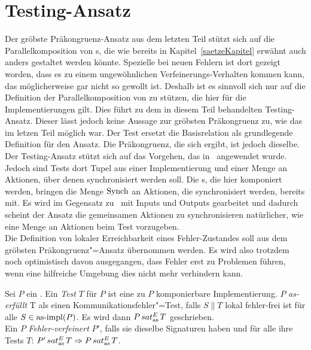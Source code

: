 \section{Testing-Ansatz}

Der gröbste Präkongruenz-Ansatz aus dem letzten Teil stützt sich auf die
Parallelkomposition von \MEIO{}s, die wie bereits in
Kapitel~\ref{saetzeKapitel} erwähnt auch anders gestaltet werden könnte.
Spezielle bei neuen Fehlern ist dort gezeigt worden, dass es zu einem
ungewöhnlichen Verfeinerungs-Verhalten kommen kann, das möglicherweise gar
nicht so gewollt ist. Deshalb ist es sinnvoll sich nur auf die Definition der
Parallelkomposition von \EIO{} zu stützen, die hier für die Implementierungen
gilt. Dies führt zu dem in diesem Teil behandelten Testing-Ansatz. Dieser lässt
jedoch keine Aussage zur gröbsten Präkongruenz zu, wie das im letzen Teil
möglich war. Der Test ersetzt die Basisrelation als grundlegende Definition für
den Ansatz. Die Präkongruenz, die sich ergibt, ist jedoch dieselbe.\\
Der Testing-Ansatz stützt sich auf das Vorgehen, das
in~\cite{Vogler2015FailSem} angewendet wurde. Jedoch sind Tests dort Tupel aus
einer Implementierung und einer Menge an Aktionen, über denen synchronisiert
werden soll. Die \MEIO{}s, die hier komponiert werden, bringen die Menge
$\mathrm{Synch}$ an Aktionen, die synchronisiert werden, bereits mit. Es wird im
Gegensatz zu~\cite{Vogler2015FailSem} mit Inputs und Outputs gearbeitet und
dadurch scheint der Ansatz die gemeinsamen Aktionen zu synchronisieren
natürlicher, wie eine Menge an Aktionen beim Test vorzugeben.\\
Die Definition von lokaler Erreichbarkeit eines Fehler-Zustandes soll aus dem
gröbsten Präkongruenz"=Ansatz übernommen werden. Es wird also trotzdem noch
optimistisch davon ausgegangen, dass Fehler erst zu Problemen führen, wenn eine
hilfreiche Umgebung dies nicht mehr verhindern kann.

\begin{Def}
  \label{KommTestDef}
  Sei $P$ ein \MEIO{}. Ein \emph{Test} $T$ für $P$ ist eine zu $P$ komponierbare
  Implementierung. $P$ \emph{as-erfüllt} T als einen
  Kommunikationsfehler"=Test, falls $S\|T$ lokal fehler-frei ist für alle $S\in
  \mathrm{as}\text{-}\mathrm{impl} (P)$. Es wird dann $P \hspace{0.05cm}sat_\mathrm{as}^E\hspace{0.05cm} T$ geschrieben.\\
  Ein \MEIO{} $P$ \emph{Fehler-verfeinert} $P'$, falls sie dieselbe Signaturen
  haben und für alle ihre Tests $T$: $P'\hspace{0.05cm}sat_\mathrm{as}^E\hspace{0.05cm} T \Rightarrow P\hspace{0.05cm}sat_\mathrm{as}^E\hspace{0.05cm} T$.
\end{Def}

